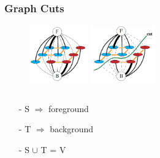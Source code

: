 \documentclass[notheorems,mathserif,table,compress]{beamer}  %
\begin{document}
\begin{frame}
\frametitle{Graph Cuts}
    \begin{figure}[!ht]
    \begin{minipage}[t]{0.45\linewidth}
    \centering
    \includegraphics[width=1.0in]{graphcut1.png}
    \end{minipage}
    \begin{minipage}[t]{0.45\linewidth}
    \centering
    \includegraphics[width=1.1in]{graphcut2.png}
    \end{minipage}
    \end{figure}

    \begin{columns}
       \begin{column}[c]{0.4\textwidth}
	
	  \begin{itemize}
	\centering
	  \item[-]  {\Large S $\Rightarrow$ foreground}
	  \item[-] {\Large T $\Rightarrow$ background }
	  \item[-] {\Large  S $\cup$ T = V}
	  \end{itemize}
        \end{column}
 

\end{columns}
\end{frame}
\end{document}
